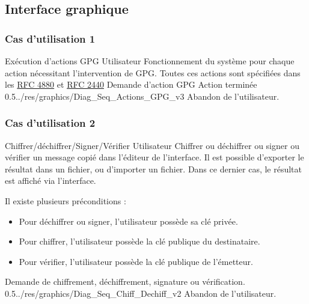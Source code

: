 \documentclass{../res/univ-projet}
\begin{document}
\subsection{Interface graphique}

\subsubsection{Cas d'utilisation 1}
\ficheGraphic
{Exécution d'actions GPG}
{Utilisateur}
{
  Fonctionnement du système pour chaque action nécessitant l'intervention de GPG.
  Toutes ces actions sont spécifiées dans les
  \newline
  \href{http://tools.ietf.org/html/rfc4880}{RFC 4880}
  et \href{http://tools.ietf.org/html/rfc2440}{RFC 2440}
}
{}
{Demande d'action GPG}
{Action terminée}
{0.5}{../res/graphics/Diag_Seq_Actions_GPG_v3}
{Abandon de l'utilisateur.}
\vspace{0.5cm}

\subsubsection{Cas d'utilisation 2}
\ficheGraphic
{Chiffrer/déchiffrer/Signer/Vérifier}
{Utilisateur}
{Chiffrer ou déchiffrer ou signer ou vérifier un message copié dans l'éditeur de l'interface. Il est possible d'exporter le résultat dans un fichier, ou d'importer un fichier. Dans ce dernier cas, le résultat est affiché via l'interface.}
{
  Il existe plusieurs préconditions :
  \begin{itemize}
    \item Pour déchiffrer ou signer, l'utilisateur possède sa clé privée.
    \item Pour chiffrer, l'utilisateur possède la clé publique du destinataire.
    \item Pour vérifier, l'utilisateur possède la clé publique de l'émetteur.
  \end{itemize}
}
{Demande de chiffrement, déchiffrement, signature ou vérification.}
{}
{0.5}{../res/graphics/Diag_Seq_Chiff_Dechiff_v2}
{Abandon de l'utilisateur.}
\vspace{0.5cm}
\end{document}
